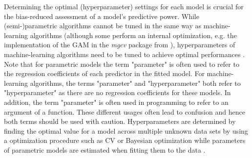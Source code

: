 \documentclass[review]{elsarticle}
\begin{document}
Determining the optimal (hyperparameter) settings for each model is crucial for the bias-reduced assessment of a model's predictive power.
While (semi-)parametric algorithms cannot be tuned in the same way as machine-learning algorithms (although some perform an internal optimization, e.g. the implementation of the GAM in the \textit{mgcv} package from \cite{mgcv}), hyperparameters of machine-learning algorithms need to be tuned to achieve optimal performances \citep{Bergstra2012, Duarte2017, Hutter2011}.
Note that for parametric models the term "parameter" is often used to refer to the regression coefficients of each predictor in the fitted model.
For machine-learning algorithms, the terms "parameter" and "hyperparameter" both refer to "hyperparameter" as there are no regression coefficients for these models.
In addition, the term "parameter" is often used in programming to refer to an argument of a function.
These different usages often lead to confusion and hence both terms should be used with caution.
Hyperparameters are determined by finding the optimal value for a model across multiple unknown data sets by using a optimization procedure such as \ac{CV} or Bayesian optimization while parameters of parametric models are estimated when fitting them to the data \citep{Kuhn2013}.
\end{document}
